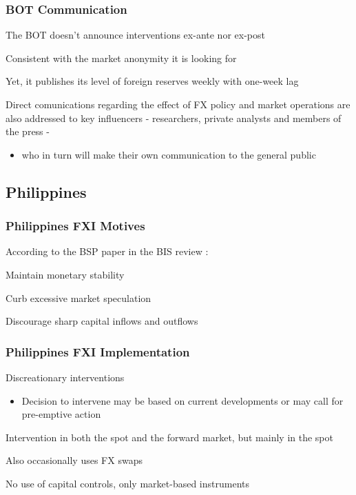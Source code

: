 \documentclass{beamer}
\newenvironment{wideitemize}{\itemize\addtolength{\itemsep}{10pt}}{\enditemize}
\newenvironment{wideenumerate}{\enumerate\addtolength{\itemsep}{10pt}}{\endenumerate}
\begin{document}
\begin{frame}
  \frametitle{BOT Communication}
  \begin{wideitemize}
  \item The BOT doesn't announce interventions ex-ante nor ex-post
  \item Consistent with the market anonymity it is looking for
  \item Yet, it publishes its level of foreign reserves weekly with one-week lag
   \item Direct comunications regarding the effect of FX policy and market operations are also addressed to key influencers - researchers, private analysts and members of the press -
      \begin{itemize}
      \item who in turn will make their own communication to the general public
      \end{itemize}
  \end{wideitemize}
\end{frame}


\subsection{Philippines}


\begin{frame}
  \frametitle{Philippines FXI Motives}
  According to the BSP paper in the BIS review \href{https://www.bis.org/publ/bppdf/bispap73s.pdf}{}:
  \begin{wideenumerate}
    \item Maintain monetary stability
    \item Curb excessive market speculation
    \item Discourage sharp capital inflows and outflows
  \end{wideenumerate}  
\end{frame}


\begin{frame}
  \frametitle{Philippines FXI Implementation}
  \begin{wideitemize}
    \item Discreationary interventions
      \begin{itemize}
      \item Decision to intervene may be based on current developments or may call for pre-emptive action
      \end{itemize}
    \item Intervention in both the spot and the forward market, but mainly in the spot
    \item Also occasionally uses FX swaps
    \item No use of capital controls, only market-based instruments
  \end{wideitemize}
\end{frame}
\end{document}
